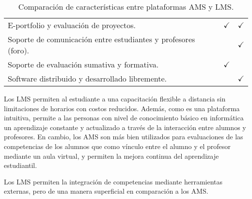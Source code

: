\begin{table}[H]
{\begin{tabular}{lllcc}
		\multicolumn{3}{l}{E-portfolio y evaluación de proyectos.}                                              & $\checkmark$         & $\checkmark$         \\
		\multicolumn{3}{l}{Soporte de comunicación entre estudiantes y profesores (foro).}                      &           & $\checkmark$         \\
		\multicolumn{3}{l}{Soporte de evaluación sumativa y formativa.}                                         & $\checkmark$         &           \\
		\multicolumn{3}{l}{Software distribuido y desarrollado libremente.}                                     &           & $\checkmark$         \\
		\bottomrule
	\end{tabular}
	}
	\caption{Comparación de características entre plataformas AMS y LMS.}
  \label{comparacion_ams_lms}
\end{table}

Los LMS permiten al estudiante a una capacitación flexible a distancia sin limitaciones de horarios con costos reducidos\citep{de2016design}. Además, como es una plataforma intuitiva, permite a las personas con nivel de conocimiento básico en informática un aprendizaje constante y actualizado a través de la interacción entre alumnos y profesores. En cambio, los AMS son más bien utilizados para evaluaciones de las competencias de los alumnos que como vínculo entre el alumno y el profesor mediante un aula virtual, y permiten la mejora continua del aprendizaje estudiantil.

Los LMS permiten la integración de competencias mediante herramientas externas, pero de una manera superficial en comparación a los AMS.